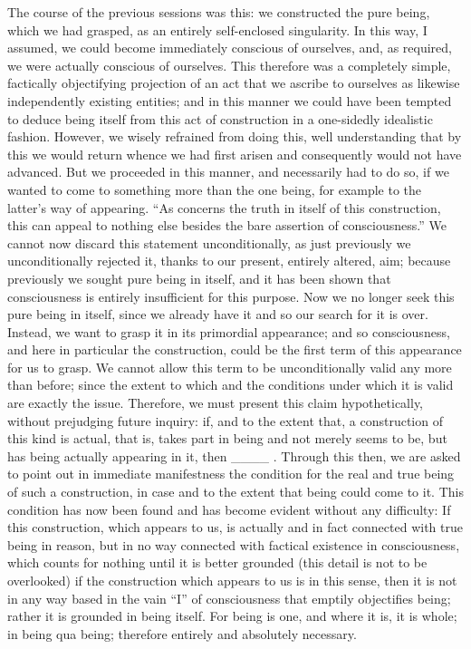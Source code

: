 The course of the previous sessions was this:
we constructed the pure being, which we had grasped,
as an entirely self-enclosed singularity.
In this way, I assumed, we could become
immediately conscious of ourselves,
and, as required, we were actually conscious of ourselves.
This therefore was a completely simple, factically objectifying
projection of an act that we ascribe to ourselves
as likewise independently existing entities;
and in this manner we could have been tempted
to deduce being itself from this act of
construction in a one-sidedly idealistic fashion.
However, we wisely refrained from doing this,
well understanding that by this we would return
whence we had first arisen
and consequently would not have advanced.
But we proceeded in this manner,
and necessarily had to do so,
if we wanted to come to something
more than the one being,
for example to the latter's way of appearing.
“As concerns the truth in itself of this construction,
this can appeal to nothing else besides
the bare assertion of consciousness.”
We cannot now discard this statement unconditionally,
as just previously we unconditionally rejected it,
thanks to our present, entirely altered, aim;
because previously we sought pure being in itself,
and it has been shown that consciousness is
entirely insufficient for this purpose.
Now we no longer seek this pure being in itself,
since we already have it
and so our search for it is over.
Instead, we want to grasp it in its primordial appearance;
and so consciousness, and here in particular the construction,
could be the first term of this appearance for us to grasp.
We cannot allow this term to be unconditionally valid
any more than before;
since the extent to which and the conditions under which
it is valid are exactly the issue.
Therefore, we must present this claim hypothetically,
without prejudging future inquiry:
if, and to the extent that, a construction of this kind is actual,
that is, takes part in being and not merely seems to be,
but has being actually appearing in it, then ____ .
Through this then, we are asked to point out
in immediate manifestness the condition for
the real and true being of such a construction,
in case and to the extent that being could come to it.
This condition has now been found and has become
evident without any difficulty:
If this construction, which appears to us,
is actually and in fact connected with true being in reason,
but in no way connected with factical existence in consciousness,
which counts for nothing until it is better grounded
(this detail is not to be overlooked)
if the construction which appears to us is in this sense,
then it is not in any way based in the vain “I”
of consciousness that emptily objectifies being;
rather it is grounded in being itself.
For being is one,
and where it is, it is whole;
in being qua being;
therefore entirely and absolutely necessary.

